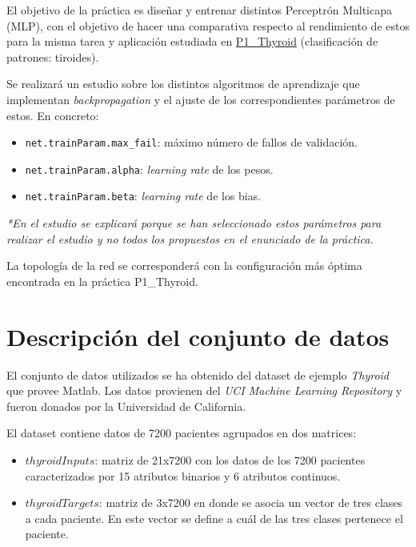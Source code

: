 \documentclass[a4paper,12pt,titlepage]{article}
\begin{document}
El objetivo de la práctica es diseñar y entrenar distintos Perceptrón Multicapa (MLP), con el objetivo de hacer una comparativa respecto al rendimiento de estos para la misma tarea y aplicación estudiada en \href{https://github.com/davidmigloz/neuronal-networks/tree/master/P1\_Thyroid}{P1\_Thyroid} (clasificación de patrones: tiroides).

Se realizará un estudio sobre los distintos algoritmos de aprendizaje que implementan \textit{backpropagation} y el ajuste de los correspondientes parámetros de estos. En concreto:

\begin{itemize}[noitemsep]
	\item \lstinline|net.trainParam.max_fail|: máximo número de fallos de validación.
	\item \lstinline|net.trainParam.alpha|: \textit{learning rate} de los pesos.
	\item \lstinline|net.trainParam.beta|: \textit{learning rate} de los bias.
\end{itemize}

\textit{*En el estudio se explicará porque se han seleccionado estos parámetros para realizar el estudio y no todos los propuestos en el enunciado de la práctica.}

La topología de la red se corresponderá con la configuración más óptima encontrada en la práctica P1\_Thyroid.

\section{Descripción del conjunto de datos}

El conjunto de datos utilizados se ha obtenido del dataset de ejemplo \emph{Thyroid} que provee Matlab. Los datos provienen del \emph{UCI Machine Learning Repository} \citep{Asuncion+Newman:2007} y fueron donados por la Universidad de California.

El dataset contiene datos de 7200 pacientes agrupados en dos matrices:

\begin{itemize}[noitemsep]
	\item $thyroidInputs$: matriz de 21x7200 con los datos de los 7200 pacientes caracterizados por 15 atributos binarios y 6 atributos continuos.
	\item $thyroidTargets$: matriz de 3x7200 en donde se asocia un vector de tres clases a cada paciente. En este vector se define a cuál de las tres clases pertenece el paciente.
\end{itemize}
\end{document}
